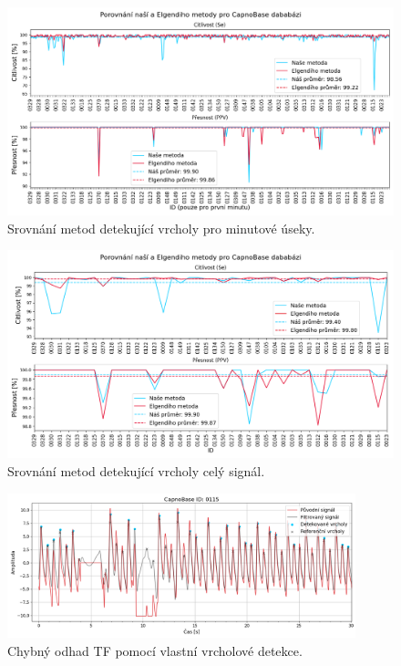 \begin{figure}[!ht]
	\centering
	\includegraphics[width=1\textwidth]{./obrazky/vysledky/CB_Elgendi_Our_chunked.png}
	\caption[Srovnání metod detekující vrcholy pro minutové úseky]{Srovnání metod detekující vrcholy pro minutové úseky.}
	\label{fig:capnobase_SePPV_1min}
\end{figure}

\begin{figure}[!ht]
	\centering
	\includegraphics[width=1\textwidth]{./obrazky/vysledky/CB_Elgendi_Our_full.png}
	\caption[Srovnání metod detekující vrcholy pro celý signál]{Srovnání metod detekující vrcholy celý signál.}
	\label{fig:capnobase_SePPV_8min}
\end{figure}

\begin{figure}[!ht]
	\centering
	\includegraphics[width=0.9\textwidth]{./obrazky/vysledky/CB_Our_err.png}
	\caption[Chybný odhad \acs{TF} pomocí vlastní vrcholové detekce]{Chybný odhad TF pomocí vlastní vrcholové detekce.}
	\label{fig:capnobase_our_err}
\end{figure}

